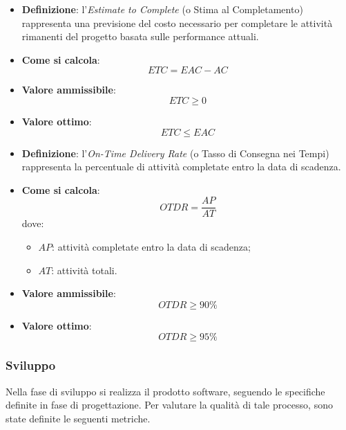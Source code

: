 \begin{itemize}
	\item \textbf{Definizione}: l'\textit{Estimate to Complete} (o Stima al Completamento) rappresenta una previsione del costo necessario per completare le attività rimanenti del progetto basata sulle performance attuali.
	\item \textbf{Come si calcola}: \begin{equation*}ETC = EAC - AC\end{equation*}
	\item \textbf{Valore ammissibile}: \begin{equation*}ETC \geq 0\end{equation*}
	\item \textbf{Valore ottimo}: \begin{equation*}ETC \leq EAC\end{equation*}
\end{itemize}

\begin{itemize}
	\item \textbf{Definizione}: l'\textit{On-Time Delivery Rate} (o Tasso di Consegna nei Tempi) rappresenta la percentuale di attività completate entro la data di scadenza.
	\item \textbf{Come si calcola}: \begin{equation*}OTDR = \frac{AP}{AT}\end{equation*} dove:
		\begin{itemize}
			\item $AP$: attività completate entro la data di scadenza;
			\item $AT$: attività totali.
		\end{itemize}
	\item \textbf{Valore ammissibile}: \begin{equation*}OTDR \geq 90\%\end{equation*}
	\item \textbf{Valore ottimo}: \begin{equation*}OTDR \geq 95\%\end{equation*}
\end{itemize}



\subsubsection{Sviluppo}
Nella fase di sviluppo si realizza il prodotto software, seguendo le specifiche definite in fase di progettazione.
Per valutare la qualità di tale processo, sono state definite le seguenti metriche.

